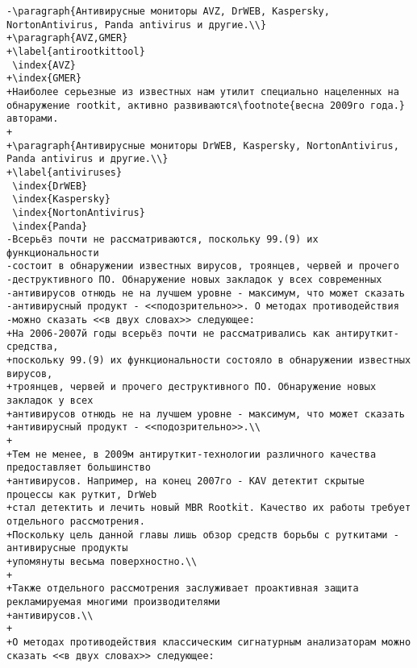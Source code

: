 \begin{verbatim}
-\paragraph{Антивирусные мониторы AVZ, DrWEB, Kaspersky, NortonAntivirus, Panda antivirus и другие.\\}
+\paragraph{AVZ,GMER}
+\label{antirootkittool}
 \index{AVZ}
+\index{GMER}
+Наиболее серьезные из известных нам утилит специально нацеленных на обнаружение rootkit, активно развиваются\footnote{весна 2009го года.} авторами.
+
+\paragraph{Антивирусные мониторы DrWEB, Kaspersky, NortonAntivirus, Panda antivirus и другие.\\}
+\label{antiviruses}
 \index{DrWEB}
 \index{Kaspersky}
 \index{NortonAntivirus}
 \index{Panda}
-Всерьёз почти не рассматриваются, поскольку 99.(9) их функциональности
-состоит в обнаружении известных вирусов, троянцев, червей и прочего
-деструктивного ПО. Обнаружение новых закладок у всех современных
-антивирусов отнюдь не на лучшем уровне - максимум, что может сказать
-антивирусный продукт - <<подозрительно>>. О методах противодействия
-можно сказать <<в двух словах>> следующее:
+На 2006-2007й годы всерьёз почти не рассматривались как антируткит-средства,
+поскольку 99.(9) их функциональности состояло в обнаружении известных вирусов,
+троянцев, червей и прочего деструктивного ПО. Обнаружение новых закладок у всех
+антивирусов отнюдь не на лучшем уровне - максимум, что может сказать
+антивирусный продукт - <<подозрительно>>.\\
+
+Тем не менее, в 2009м антируткит-технологии различного качества предоставляет большинство
+антивирусов. Например, на конец 2007го - KAV детектит скрытые процессы как руткит, DrWeb
+стал детектить и лечить новый MBR Rootkit. Качество их работы требует отдельного рассмотрения.
+Поскольку цель данной главы лишь обзор средств борьбы с руткитами - антивирусные продукты
+упомянуты весьма поверхностно.\\
+
+Также отдельного рассмотрения заслуживает проактивная защита рекламируемая многими производителями
+антивирусов.\\
+
+О методах противодействия классическим сигнатурным анализаторам можно сказать <<в двух словах>> следующее:


\end{verbatim}
